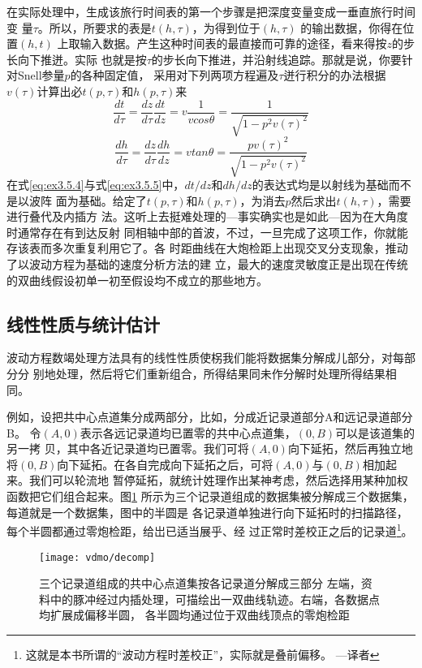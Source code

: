 在实际处理中，生成该旅行时间表的第一个步骤是把深度变量变成一垂直旅行时间变
量$\tau$。所以，所要求的表是$t(h, \tau)$，为得到位于$(h, \tau)$
的输出数据，你得在位置$(h,t)$
上取输入数据。产生这种时间表的最直接而可靠的途径，看来得按$z$的步长向下推迸。实际
也就是按$\tau$的步长向下推进，并沿射线追踪。那就是说，你要针对Snell参量$p$的各种固定值，
采用对下列两项方程遍及$\tau$迸行积分的办法根据$v(\tau)$计算出必$t(p,\tau)$和$h(p,\tau)$来
\begin{equation}
\frac{dt}{d\tau}=\frac{dz}{d\tau}\frac{dt}{dz}=v\frac{1}{vcos\theta}=\frac{1}{\sqrt{1-p^2v(\tau)^2}}
\label{eq:ex3.5.4}
\end{equation}
\begin{equation}
\frac{dh}{d\tau}=\frac{dz}{d\tau}\frac{dh}{dz}=vtan\theta=\frac{pv(\tau)^2}{\sqrt{1-p^2v(\tau)^2}}
\label{eq:ex3.5.5}
\end{equation}
在式\ref{eq:ex3.5.4}与式\ref{eq:ex3.5.5}中，$dt/dz$和$dh/dz$的表达式均是以射线为基础而不是以波阵
面为基础。给定了$t(p,\tau)$和$h(p,\tau)$，为消去$p$然后求出$t(h,\tau)$，需要进行叠代及内插方
法。这听上去挺难处理的---事实确实也是如此---因为在大角度时通常存在有到达反射
同相轴中部的首波，不过，一旦完成了这项工作，你就能存该表而多次重复利用它了。各
时距曲线在大炮检距上出现交叉分支现象，推动了以波动方程为基础的速度分析方法的建
立，最大的速度灵敏度正是出现在传统的双曲线假设初单一初至假设均不成立的那些地方。


\subsection{线性性质与统计估计}
\label{sec:3.5.5}

波动方程数竭处理方法具有的线性性质使柺我们能将数据集分解成儿部分，对每部分分
别地处理，然后将它们重新组合，所得结果同未作分解时处理所得结果相同。

例如，设把共中心点道集分成两部分，比如，分成近记录道部分A和远记录道部分B。
令$(A,0)$表示各远记录道均已置零的共中心点道集，$(0,B)$可以是该道集的另一拷
贝，其中各近记录道均已置零。我们可将$(A,0)$向下延拓，然后再独立地将$(0,
B)$向下延拓。在各自完成向下延拓之后，可将$(A,0)$与$(0,B)$相加起来。我们可以轮流地
暂停延拓，就统计姓理作出某神考虑，然后选择用某种加权函数把它们组合起来。图\ref{fig:vdmo/decomp}
所示为三个记录道组成的数据集被分解成三个数据集，每道就是一个数据集，图中的半圆是
各记录道单独进行向下延拓时的扫描路径，每个半圆都通过零炮检距，给岀已适当展乎、经
过正常时差校正之后的记录道\footnote{这就是本书所谓的“波动方程时差校正”，实际就是叠前偏移。 ---译者}。

\begin{figure}[H]
\centering
\texttt{[image: vdmo/decomp]}
\caption[decomp]{三个记录道组成的共中心点道集按各记录道分解成三部分
左端，资料中的豚冲经过内插处理，可描绘出一双曲线轨迹。右端，各数据点均扩展成偏移半圆，
各半圆均通过位于双曲线顶点的零炮检距}
\label{fig:vdmo/decomp}
\end{figure}

